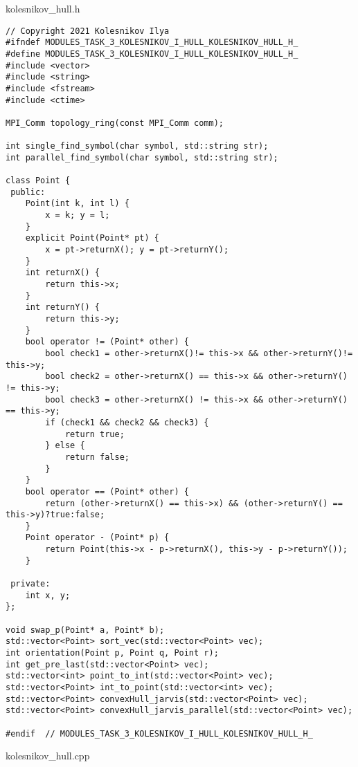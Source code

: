 \documentclass{report}
\begin{document}
kolesnikov\_hull.h
\begin{lstlisting}
// Copyright 2021 Kolesnikov Ilya
#ifndef MODULES_TASK_3_KOLESNIKOV_I_HULL_KOLESNIKOV_HULL_H_
#define MODULES_TASK_3_KOLESNIKOV_I_HULL_KOLESNIKOV_HULL_H_
#include <vector>
#include <string>
#include <fstream>
#include <ctime>

MPI_Comm topology_ring(const MPI_Comm comm);

int single_find_symbol(char symbol, std::string str);
int parallel_find_symbol(char symbol, std::string str);

class Point {
 public:
    Point(int k, int l) {
        x = k; y = l;
    }
    explicit Point(Point* pt) {
        x = pt->returnX(); y = pt->returnY();
    }
    int returnX() {
        return this->x;
    }
    int returnY() {
        return this->y;
    }
    bool operator != (Point* other) {
        bool check1 = other->returnX()!= this->x && other->returnY()!= this->y;
        bool check2 = other->returnX() == this->x && other->returnY() != this->y;
        bool check3 = other->returnX() != this->x && other->returnY() == this->y;
        if (check1 && check2 && check3) {
            return true;
        } else {
            return false;
        }
    }
    bool operator == (Point* other) {
        return (other->returnX() == this->x) && (other->returnY() == this->y)?true:false;
    }
    Point operator - (Point* p) {
        return Point(this->x - p->returnX(), this->y - p->returnY());
    }

 private:
    int x, y;
};

void swap_p(Point* a, Point* b);
std::vector<Point> sort_vec(std::vector<Point> vec);
int orientation(Point p, Point q, Point r);
int get_pre_last(std::vector<Point> vec);
std::vector<int> point_to_int(std::vector<Point> vec);
std::vector<Point> int_to_point(std::vector<int> vec);
std::vector<Point> convexHull_jarvis(std::vector<Point> vec);
std::vector<Point> convexHull_jarvis_parallel(std::vector<Point> vec);

#endif  // MODULES_TASK_3_KOLESNIKOV_I_HULL_KOLESNIKOV_HULL_H_
\end{lstlisting}
kolesnikov\_hull.cpp
\end{document}
